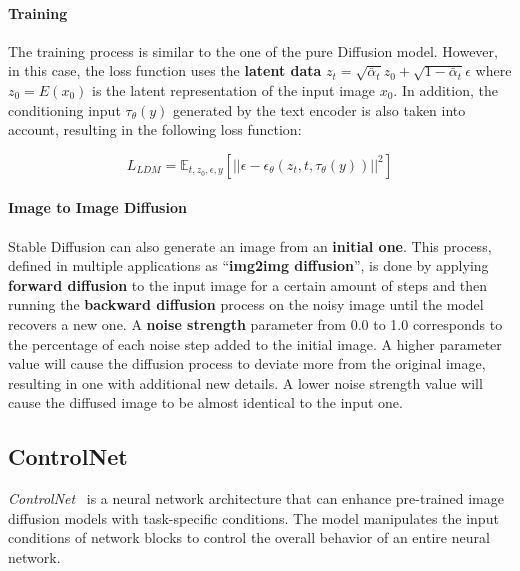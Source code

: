 \documentclass[sn-mathphys,Numbered]{sn-jnl}
\theoremstyle{thmstyleone}%
\theoremstyle{thmstyletwo}%
\theoremstyle{thmstylethree}%
\begin{document}
\paragraph{Training}

The training process is similar to the one of the pure Diffusion model.
However, in this case, the loss function uses the \textbf{latent data} $z_t=\sqrt{\bar{\alpha}_t}z_0 + \sqrt{1-\bar{\alpha}_t}\epsilon$ where $z_0 = E(x_0)$ is the latent representation of the input image $x_0$. In addition, the conditioning input $\tau_\theta(y)$ generated by the text encoder is also taken into account, resulting in the following loss function:

\begin{equation}
	L_{LDM} = \mathbb{E}_{t,z_0,\epsilon,y}\left[||\epsilon-\epsilon_\theta(z_t,t,\tau_\theta(y))||^2\right]
\end{equation}



\paragraph{Image to Image Diffusion}

Stable Diffusion can also generate an image from an \textbf{initial one}. This process, defined in multiple applications  as ``\textbf{img2img diffusion}'', is done by applying \textbf{forward diffusion} to the input image for a certain amount of steps and then running the \textbf{backward diffusion} process on the noisy image until the model recovers a new one. A \textbf{noise strength} parameter  from 0.0 to 1.0 corresponds to the percentage of each noise step added to the initial image. 
A higher parameter value will cause the diffusion process to deviate more from the original image, resulting in one with additional new details. A lower noise strength value will cause the diffused image to be almost identical to the input one.



\subsection{ControlNet}\label{sect:controlnet}

\emph{ControlNet}~\cite{zhang2023adding} is a neural network architecture that can enhance  pre-trained image diffusion models with task-specific conditions.  The model manipulates the input conditions of network blocks to control the overall behavior of an entire neural network.
\end{document}
